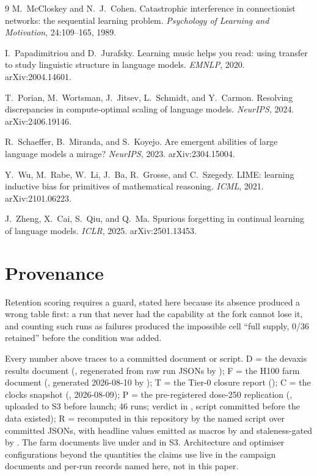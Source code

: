 \documentclass{article}
\begin{document}
\begin{thebibliography}{9}
M.~McCloskey and N.~J.~Cohen. Catastrophic interference in connectionist networks: the
sequential learning problem. \emph{Psychology of Learning and Motivation}, 24:109--165, 1989.

I.~Papadimitriou and D.~Jurafsky. Learning music helps you read: using transfer to study
linguistic structure in language models. \emph{EMNLP}, 2020. arXiv:2004.14601.

T.~Porian, M.~Wortsman, J.~Jitsev, L.~Schmidt, and Y.~Carmon. Resolving discrepancies in
compute-optimal scaling of language models. \emph{NeurIPS}, 2024. arXiv:2406.19146.

R.~Schaeffer, B.~Miranda, and S.~Koyejo. Are emergent abilities of large language models a
mirage? \emph{NeurIPS}, 2023. arXiv:2304.15004.

Y.~Wu, M.~Rabe, W.~Li, J.~Ba, R.~Grosse, and C.~Szegedy. LIME: learning inductive bias for
primitives of mathematical reasoning. \emph{ICML}, 2021. arXiv:2101.06223.

J.~Zheng, X.~Cai, S.~Qiu, and Q.~Ma. Spurious forgetting in continual learning of language
models. \emph{ICLR}, 2025. arXiv:2501.13453.

\end{thebibliography}

\appendix
\section{Provenance}
\label{sec:provenance}

Retention scoring requires a guard, stated here because its absence produced a wrong table
first: a run that never had the capability at the fork cannot lose it, and counting such
runs as failures produced the impossible cell ``full supply, 0/36 retained'' before the
condition was added.

{\sloppy
Every number above traces to a committed document or script. D = the devaxis results
document (, regenerated from raw run
JSONs by ); F = the H100 farm document
(, generated 2026-08-10 by ); T =
the Tier-0 closure report (); C = the clocks snapshot
(, 2026-08-09); P = the pre-registered dose-250 replication
(, uploaded to S3 before launch; 46 runs; verdict in
, script committed before the data existed); R = recomputed
in this repository by the named script over committed JSONs, with headline values emitted as
macros by  and staleness-gated by .
The farm documents live under  and in S3.
Architecture and optimiser configurations beyond the quantities the claims use live in the
campaign documents and per-run records named here, not in this paper.\par}
\end{document}
